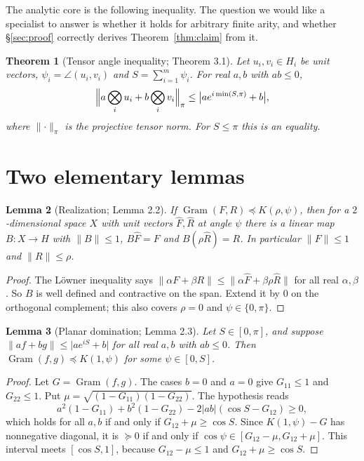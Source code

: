 \documentclass[11pt]{amsart}
\newtheorem{theorem}{Theorem}
\newtheorem{lemma}[theorem]{Lemma}
\theoremstyle{definition}
\newcommand{\Gram}{\operatorname{Gram}}
\newcommand{\norm}[1]{\lVert #1\rVert}
\newcommand{\abs}[1]{\lvert #1\rvert}
\begin{document}
The analytic core is the following inequality. The question we would like a
specialist to answer is whether it holds for arbitrary finite arity, and whether
\S\ref{sec:proof} correctly derives Theorem~\ref{thm:claim} from it.

\begin{theorem}[Tensor angle inequality; Theorem 3.1]\label{thm:TA}
Let $u_i,v_i\in H_i$ be unit vectors, $\psi_i=\angle(u_i,v_i)$ and $S=\sum_{i=1}^m\psi_i$.
For real $a,b$ with $ab\le0$,
\[
\Bigl\|a\bigotimes_iu_i+b\bigotimes_iv_i\Bigr\|_\pi\le\bigl|ae^{i\min(S,\pi)}+b\bigr|,
\]
where $\norm\cdot_\pi$ is the projective tensor norm. For $S\le\pi$ this is an equality.
\end{theorem}

\section{Two elementary lemmas}

\begin{lemma}[Realization; Lemma 2.2]\label{lem:real}
If $\Gram(F,R)\preceq K(\rho,\psi)$, then for a $2$-dimensional space $X$ with unit
vectors $\hat F,\hat R$ at angle $\psi$ there is a linear map $B:X\to H$ with
$\norm B\le1$, $B\hat F=F$ and $B(\rho\hat R)=R$. In particular $\norm F\le1$ and
$\norm R\le\rho$.
\end{lemma}

\begin{proof}
The Löwner inequality says $\norm{\alpha F+\beta R}\le\norm{\alpha\hat F+\beta\rho\hat R}$
for all real $\alpha,\beta$. So $B$ is well defined and contractive on the span.
Extend it by $0$ on the orthogonal complement; this also covers $\rho=0$ and
$\psi\in\{0,\pi\}$.
\end{proof}

\begin{lemma}[Planar domination; Lemma 2.3]\label{lem:planar}
Let $S\in[0,\pi]$, and suppose $\norm{af+bg}\le\abs{ae^{iS}+b}$ for all real $a,b$
with $ab\le0$. Then $\Gram(f,g)\preceq K(1,\psi)$ for some $\psi\in[0,S]$.
\end{lemma}

\begin{proof}
Let $G=\Gram(f,g)$. The cases $b=0$ and $a=0$ give $G_{11}\le1$ and
$G_{22}\le1$. Put $\mu=\sqrt{(1-G_{11})(1-G_{22})}$. The hypothesis reads
\[
a^2(1-G_{11})+b^2(1-G_{22})-2\abs{ab}(\cos S-G_{12})\ge0,
\]
which holds for all $a,b$ if and only if $G_{12}+\mu\ge\cos S$. Since
$K(1,\psi)-G$ has nonnegative diagonal, it is $\succeq0$ if and only if
$\cos\psi\in[G_{12}-\mu,G_{12}+\mu]$. This interval meets $[\cos S,1]$, because
$G_{12}-\mu\le1$ and $G_{12}+\mu\ge\cos S$.
\end{proof}
\end{document}
